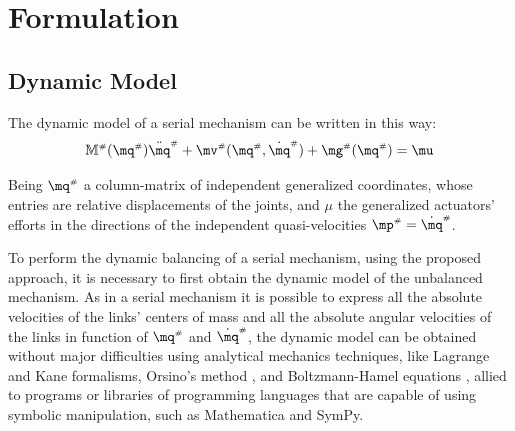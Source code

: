 \documentclass[a4paper,11pt,brazil,fleqn]{article}
\begin{document}

\section{Formulation}\label{S02}

\subsection{Dynamic Model}\label{S02-1}

The dynamic model of a serial mechanism can be written in this way:
\begin{equation}\label{eq:SerialDynamics}
\mM\ssh (\mq\ssh) \ddot{\mq}\ssh + \mv\ssh(\mq\ssh,\dot{\mq}\ssh) + \mg\ssh (\mq\ssh) = \mu
\end{equation}

Being $\mq\ssh$ a column-matrix of independent generalized coordinates, whose entries are relative displacements of the joints, and $\mu$ the generalized actuators' efforts in the directions of the independent quasi-velocities $\mp\ssh = \dot{\mq}\ssh$.

To perform the dynamic balancing of a serial mechanism, using the proposed approach, it is necessary to first obtain the dynamic model of the unbalanced mechanism. As in a serial mechanism it is possible to express all the absolute velocities of the links' centers of mass and all the absolute angular velocities of the links in function of $\mq\ssh$ and $\dot{\mq}\ssh$, the dynamic model can be obtained without major difficulties using analytical mechanics techniques, like Lagrange \cite{18tsai} and Kane \cite{19kane} formalisms, Orsino's method \cite{21orsino}, and Boltzmann-Hamel equations \cite{22altuzarra}, allied to programs or libraries of programming languages that are capable of using symbolic manipulation, such as Mathematica and SymPy.
\end{document}
